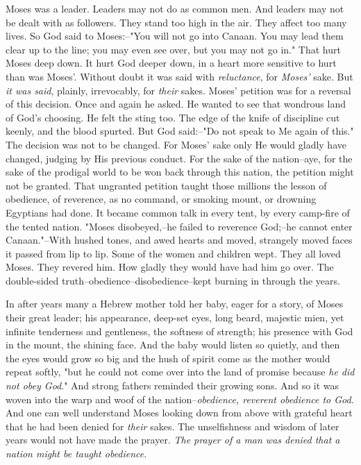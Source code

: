 Moses was a leader. Leaders may not do as common men. And leaders may not
be dealt with as followers. They stand too high in the air. They affect
too many lives. So God said to Moses:--"You will not go into Canaan. You
may lead them clear up to the line; you may even see over, but you may not
go in." That hurt Moses deep down. It hurt God deeper down, in a heart
more sensitive to hurt than was Moses'. Without doubt it was said with
\textit{reluctance}, for \textit{Moses'} sake. But \textit{it was said}, plainly, irrevocably,
for \textit{their} sakes. Moses' petition was for a reversal of this decision.
Once and again he asked. He wanted to see that wondrous land of God's
choosing. He felt the sting too. The edge of the knife of discipline cut
keenly, and the blood spurted. But God said:--"Do not speak to Me again of
this." The decision was not to be changed. For Moses' sake only He would
gladly have changed, judging by His previous conduct. For the sake of the
nation--aye, for the sake of the prodigal world to be won back through
this nation, the petition might not be granted. That ungranted petition
taught those millions the lesson of obedience, of reverence, as no
command, or smoking mount, or drowning Egyptians had done. It became
common talk in every tent, by every camp-fire of the tented nation. "Moses
disobeyed,--he failed to reverence God;--he cannot enter Canaan."--With
hushed tones, and awed hearts and moved, strangely moved faces it passed
from lip to lip. Some of the women and children wept. They all loved
Moses. They revered him. How gladly they would have had him go over. The
double-sided truth--obedience--disobedience--kept burning in through the
years.

In after years many a Hebrew mother told her baby, eager for a story, of
Moses their great leader; his appearance, deep-set eyes, long beard,
majestic mien, yet infinite tenderness and gentleness, the softness of
strength; his presence with God in the mount, the shining face. And the
baby would listen so quietly, and then the eyes would grow so big and the
hush of spirit come as the mother would repeat softly, "but he could not
come over into the land of promise because \textit{he did not obey God}." And
strong fathers reminded their growing sons. And so it was woven into the
warp and woof of the nation--\textit{obedience, reverent obedience to God}. And
one can well understand Moses looking down from above with grateful heart
that he had been denied for \textit{their} sakes. The unselfishness and wisdom of
later years would not have made the prayer. \textit{The prayer of a man was
denied that a nation might be taught obedience}.



